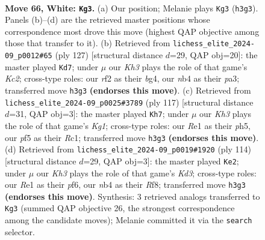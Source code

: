 \documentclass[11pt]{article}
\begin{document}
\clearpage

\begin{figure}[p]\centering
\begin{subfigure}{0.46\textwidth}\centering
\resizebox{\linewidth}{!}{%
\newchessgame
\chessboard[
  setfen={3R4/1p5p/1k4pP/p4p2/1n3P2/7K/5r2/4R3 w - - 19 66},
  showmover=false,
  pgfstyle=straightmove, color=movearrow, markmove={h3-g3}
]}
\caption{}
\end{subfigure}\hfill
\begin{subfigure}{0.46\textwidth}\centering
\resizebox{\linewidth}{!}{%
\newchessgame
\chessboard[
  setfen={8/2k5/1p2p3/4P3/1KPP2B1/P7/1P6/1b6 b - - 6 64},
  showmover=false,
  pgfstyle=straightmove, color=movearrow, markmove={c7-d7}
]}
\caption{}
\end{subfigure}
\\[4pt]
\begin{subfigure}{0.46\textwidth}\centering
\resizebox{\linewidth}{!}{%
\newchessgame
\chessboard[
  setfen={4R1k1/1p6/p4K2/P5PP/1P6/8/8/2r5 b - - 8 59},
  showmover=false,
  pgfstyle=straightmove, color=movearrow, markmove={g8-h7}
]}
\caption{}
\end{subfigure}\hfill
\begin{subfigure}{0.46\textwidth}\centering
\resizebox{\linewidth}{!}{%
\newchessgame
\chessboard[
  setfen={5R2/2p5/2pk1p2/1p6/4Pp2/r2K1P2/8/8 w - - 10 58},
  showmover=false,
  pgfstyle=straightmove, color=movearrow, markmove={d3-e2}
]}
\caption{}
\end{subfigure}
\caption{\textbf{Move 66, White: \texttt{Kg3}.} (a) Our position; Melanie plays \texttt{Kg3} (\texttt{h3g3}). Panels (b)--(d) are the retrieved master positions whose correspondence most drove this move (highest QAP objective among those that transfer to it). (b) Retrieved from \texttt{lichess\_elite\_2024-09\_p0012\#65} (ply 127) [structural distance $d$=29, QAP obj=20]: the master played \texttt{Kd7}; under $\mu$ our \emph{Kh3} plays the role of that game's \emph{Kc2}; cross-type roles: our \emph{r}f2 as their \emph{b}g4, our \emph{n}b4 as their \emph{p}a3; transferred move \texttt{h3g3} \textbf{(endorses this move)}. (c) Retrieved from \texttt{lichess\_elite\_2024-09\_p0025\#3789} (ply 117) [structural distance $d$=31, QAP obj=3]: the master played \texttt{Kh7}; under $\mu$ our \emph{Kh3} plays the role of that game's \emph{Kg1}; cross-type roles: our \emph{R}e1 as their \emph{p}h5, our \emph{p}f5 as their \emph{R}c1; transferred move \texttt{h3g3} \textbf{(endorses this move)}. (d) Retrieved from \texttt{lichess\_elite\_2024-09\_p0019\#1920} (ply 114) [structural distance $d$=29, QAP obj=3]: the master played \texttt{Ke2}; under $\mu$ our \emph{Kh3} plays the role of that game's \emph{Kd3}; cross-type roles: our \emph{R}e1 as their \emph{p}f6, our \emph{n}b4 as their \emph{R}f8; transferred move \texttt{h3g3} \textbf{(endorses this move)}. Synthesis: 3 retrieved analogs transferred to \texttt{Kg3} (summed QAP objective 26, the strongest correspondence among the candidate moves); Melanie committed it via the \texttt{search} selector.}
\label{fig:thought-m130}
\end{figure}
\end{document}
